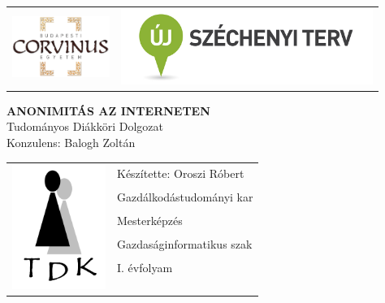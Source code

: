\thispagestyle{empty}

\begin{tabularx}{\textwidth}{lr}
	\includegraphics[width=120px]{assets/bce.png} & \includegraphics[width=310px]{assets/szechenyi.png}
\end{tabularx}

\vspace{1.4cm}

\vspace{0.8cm}
\begin{center}
\textbf{\uppercase{\Large Anonimitás az interneten}}
\vspace{0.8cm}
\\Tudományos Diákköri Dolgozat\\
\vspace{0.8cm}
Konzulens: Balogh Zoltán
\end{center}

\vfill

\begin{tabularx}{15cm}{p{5cm}p{10cm}}
	\multirow{8}{*}{\includegraphics[width=115px]{assets/tdk.png}}
	& \hfill Készítette: Oroszi Róbert \\
	& \hfill Gazdálkodástudományi kar \\
	& \hfill Mesterképzés \\
	& \hfill Gazdaságinformatikus szak \\
	& \hfill I. évfolyam \\
	& \\ & \\ & \centering{2012. március 26.}
\end{tabularx}

